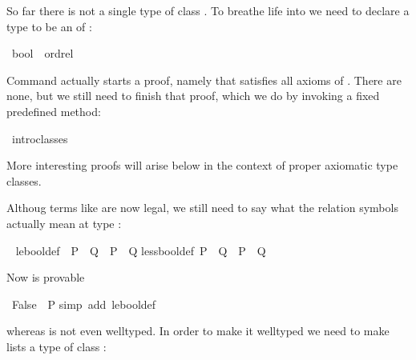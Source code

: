 \begin{isabellebody}
\begin{isamarkuptext}
So far there is not a single type of class . To breathe life
into  we need to declare a type to be an  of
:%
\end{isamarkuptext}%
\ bool\ {\isacharcolon}{\isacharcolon}\ ordrel%
\begin{isamarkuptxt}%
\noindent
Command  actually starts a proof, namely that
 satisfies all axioms of .
There are none, but we still need to finish that proof, which we do
by invoking a fixed predefined method:%
\end{isamarkuptxt}%
\ intro{\isacharunderscore}classes%
\begin{isamarkuptext}%
\noindent
More interesting  proofs will arise below
in the context of proper axiomatic type classes.

Althoug terms like  are now legal, we still need to say
what the relation symbols actually mean at type :%
\end{isamarkuptext}%
\ {\isacharparenleft}\isanewline
le{\isacharunderscore}bool{\isacharunderscore}def{\isacharcolon}\ \ {\isachardoublequote}P\ {\isacharless}{\isacharless}{\isacharequal}\ Q\ {\isasymequiv}\ P\ {\isasymlongrightarrow}\ Q{\isachardoublequote}\isanewline
less{\isacharunderscore}bool{\isacharunderscore}def{\isacharcolon}\ {\isachardoublequote}P\ {\isacharless}{\isacharless}\ Q\ {\isasymequiv}\ {\isasymnot}P\ {\isasymand}\ Q{\isachardoublequote}%
\begin{isamarkuptext}%
\noindent
Now  is provable%
\end{isamarkuptext}%
\ {\isachardoublequote}False\ {\isacharless}{\isacharless}{\isacharequal}\ P{\isachardoublequote}\isanewline
{}simp\ add{\isacharcolon}\ le{\isacharunderscore}bool{\isacharunderscore}def{\isacharparenright}%
\begin{isamarkuptext}%
\noindent
whereas \isa{{\isacharbrackleft}{\isacharbrackright}\ {\isacharless}{\isacharless}{\isacharequal}\ {\isacharbrackleft}{\isacharbrackright}} is not even welltyped. In order to make it welltyped
we need to make lists a type of class :%
\end{isamarkuptext}%
\end{isabellebody}%

